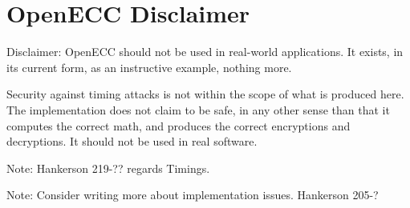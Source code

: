 \section{OpenECC Disclaimer}

Disclaimer: OpenECC should not be used in real-world applications. It exists, in its current form, as
an instructive example, nothing more.

Security against timing attacks is not within the scope of what is produced here. The implementation
does not claim to be safe, in any other sense than that it computes the correct math, and produces
the correct encryptions and decryptions. It should not be used in real software.

Note: Hankerson 219-?? regards Timings.

Note: Consider writing more about implementation issues. Hankerson 205-?